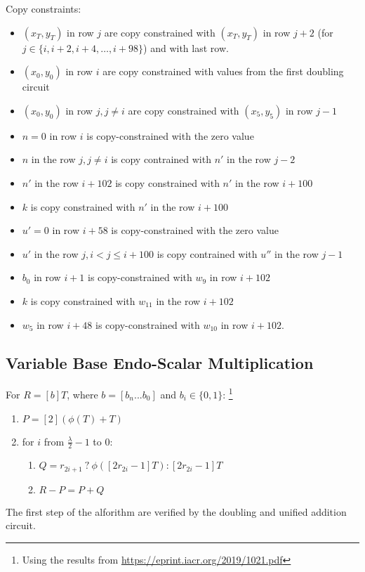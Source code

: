     Copy constraints:
    \begin{itemize}
    \item $(x_T,y_T)$ in row $j$ are copy constrained with $(x_T,y_T)$ in row $j + 2$ (for $j \in \{i, i + 2, i + 4, \dots, i + 98\}$) and with last row.
    \item $(x_0,y_0)$ in row $i$ are copy constrained with values from the first doubling circuit
    \item $(x_0,y_0)$ in row $j, j \neq i$ are copy constrained with $(x_5,y_5)$ in row $j - 1$
    \item $n = 0$ in row $i$ is copy-constrained with the zero value
    \item $n$ in the row $j, j \neq i$ is copy contrained with $n'$ in the row $j-2$
    \item $n'$ in the row $i + 102$ is copy constrained with $n'$ in the row $i + 100$
    \item $k$ is copy constrained with $n'$ in the row $i + 100$
    \item $u' = 0$ in row $i+58$ is copy-constrained with the zero value
    \item $u'$ in the row $j, i < j \leq i+100 $ is copy contrained with $u''$ in the row $j-1$
    \item $b_0$ in row $i+1$ is copy-constrained with $w_{9}$ in row $i + 102$
    \item $k$ is copy constrained with $w_{11}$ in the row $i + 102$
    \item $w_5$ in row $i+48$ is copy-constrained with $w_{10}$ in row $i + 102$.
\end{itemize}

\subsection{Variable Base Endo-Scalar Multiplication}

For $R  = [b]T$, where $b = [b_n ... b_0]$ and $b_i \in \{0, 1\}$:
 \footnote{Using the results from \url{https://eprint.iacr.org/2019/1021.pdf}}
\begin{enumerate}
    \item $P = [2](\phi(T) + T)$
    \item for $i$ from $\frac{\lambda}{2} - 1$ to $0$:
    \begin{enumerate}
        \item $Q = r_{2i + 1} \: ? \: \phi([2r_{2i} - 1]T) : [2r_{2i} - 1]T$
        \item $R - P = P + Q$
    \end{enumerate}
\end{enumerate}
The first step of the alforithm are verified by the doubling and unified addition circuit.


